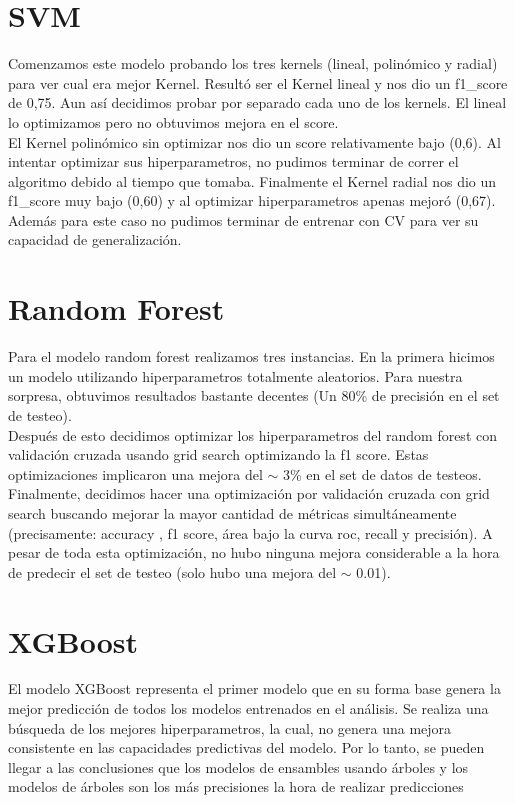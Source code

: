 \documentclass{article}
\begin{document}
\section*{SVM} 

Comenzamos este modelo probando los tres kernels (lineal, polinómico y radial) para ver cual era mejor Kernel. Resultó ser el Kernel lineal y nos dio un f1\_score de 0,75. Aun así decidimos probar por separado cada uno de los kernels. El lineal lo optimizamos pero no obtuvimos mejora en el score. \\
El Kernel polinómico sin optimizar nos dio un score relativamente bajo (0,6). Al intentar optimizar sus hiperparametros, no pudimos terminar de correr el algoritmo debido al tiempo que tomaba. Finalmente el Kernel radial nos dio un f1\_score muy bajo (0,60) y al optimizar hiperparametros apenas mejoró (0,67). Además para este caso no pudimos terminar de entrenar con CV para ver su capacidad de generalización. 

\section*{Random Forest} 

Para el modelo random forest realizamos tres instancias. En la primera hicimos un modelo utilizando hiperparametros totalmente aleatorios. Para nuestra sorpresa, obtuvimos resultados bastante decentes (Un 80\% de precisión en el set de testeo).\\
Después de esto decidimos optimizar los hiperparametros del random forest con validación cruzada usando grid search optimizando la f1 score.  Estas optimizaciones implicaron una mejora del $\sim$ 3\% en el set de datos de testeos. Finalmente, decidimos hacer una optimización por validación cruzada con grid search buscando mejorar la mayor cantidad de métricas simultáneamente (precisamente: accuracy , f1 score, área bajo la curva roc, recall y precisión). A pesar de toda esta optimización, no hubo ninguna mejora considerable a la hora de predecir el set de testeo (solo hubo una mejora del $\sim$ 0.01). 

\section*{XGBoost} 

El modelo XGBoost representa el primer modelo que en su forma base genera la mejor predicción de todos los modelos entrenados en el análisis. Se realiza una búsqueda de los mejores hiperparametros, la cual, no genera una mejora consistente en las capacidades predictivas del modelo. Por lo tanto, se pueden llegar a las conclusiones que los modelos de ensambles usando árboles y los modelos de árboles son los más precisiones  la hora de realizar predicciones
\end{document}
